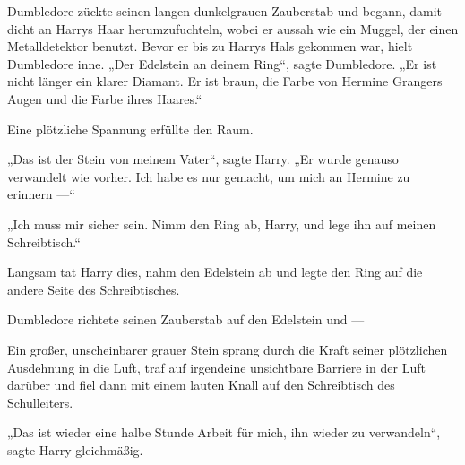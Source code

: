 
Dumbledore zückte seinen langen dunkelgrauen Zauberstab und begann, damit dicht an Harrys Haar herumzufuchteln, wobei er aussah wie ein Muggel, der einen Metalldetektor benutzt. Bevor er bis zu Harrys Hals gekommen war, hielt Dumbledore inne.
„Der Edelstein an deinem Ring“, sagte Dumbledore.
„Er ist nicht länger ein klarer Diamant. Er ist braun, die Farbe von Hermine Grangers Augen und die Farbe ihres Haares.“

Eine plötzliche Spannung erfüllte den Raum.

„Das ist der Stein von meinem Vater“, sagte Harry.
„Er wurde genauso verwandelt wie vorher. Ich habe es nur gemacht, um mich an Hermine zu erinnern —“

„Ich muss mir sicher sein. Nimm den Ring ab, Harry, und lege ihn auf meinen Schreibtisch.“

Langsam tat Harry dies, nahm den Edelstein ab und legte den Ring auf die andere Seite des Schreibtisches.

Dumbledore richtete seinen Zauberstab auf den Edelstein und —

Ein großer, unscheinbarer grauer Stein sprang durch die Kraft seiner plötzlichen Ausdehnung in die Luft, traf auf irgendeine unsichtbare Barriere in der Luft darüber und fiel dann mit einem lauten Knall auf den Schreibtisch des Schulleiters.

„Das ist wieder eine halbe Stunde Arbeit für mich, ihn wieder zu verwandeln“, sagte Harry gleichmäßig.

